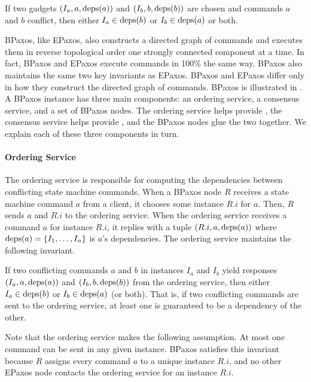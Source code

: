 \begin{boxedinvariant}
  If two gadgets $(I_a, a, \text{deps}(a))$ and $(I_b, b, \text{deps}(b))$ are chosen and
  commands $a$ and $b$ conflict, then either $I_a \in \text{deps}(b)$ or $I_b \in
  \text{deps}(a)$ or both.
\end{boxedinvariant}

BPaxos, like EPaxos, also constructs a directed graph of commands and executes
them in reverse topological order one strongly connected component at a time.
In fact, BPaxos and EPaxos execute commands in 100\% the same way. BPaxos also
maintains the same two key invariants as EPaxos. BPaxos and EPaxos differ only
in how they construct the directed graph of commands.
%
BPaxos is illustrated in . A BPaxos instance has three main
components: an ordering service, a consensus service, and a set of BPaxos
nodes. The ordering service helps provide , the
consensus service helps provide , and the BPaxos nodes
glue the two together. We explain each of these three components in turn.

{}

\paragraph{Ordering Service}
The ordering service is responsible for computing the dependencies between
conflicting state machine commands. When a BPaxos node $R$ receives a state
machine command $a$ from a client, it chooses some instance $R.i$ for $a$.
Then, $R$ sends $a$ and $R.i$ to the ordering service. When the ordering
service receives a command $a$ for instance $R.i$, it replies with a tuple
$(R.i, a, \text{deps}(a))$ where $\text{deps}(a) = \{I_1, \ldots, I_n\}$ is $a$'s
dependencies.
%
The ordering service maintains the following invariant.

\begin{boxedinvariant}
If two conflicting commands $a$ and $b$ in instances $I_a$ and $I_b$ yield
responses $(I_a, a, \text{deps}(a))$ and $(I_b, b, \text{deps}(b))$ from the ordering
service, then either $I_a \in \text{deps}(b)$ or $I_b \in \text{deps}(a)$ (or both). That
is, if two conflicting commands are sent to the ordering service, at least one
is guaranteed to be a dependency of the other.
\end{boxedinvariant}

Note that the ordering service makes the following assumption. At most one
command can be sent in any given instance. BPaxos satisfies this invariant
because $R$ assigns every command $a$ to a unique instance $R.i$, and no other
EPaxos node contacts the ordering service for an instance $R.i$.

